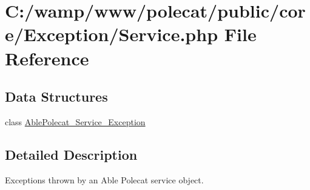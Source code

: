 \hypertarget{_exception_2_service_8php}{}\section{C\+:/wamp/www/polecat/public/core/\+Exception/\+Service.php File Reference}
\label{_exception_2_service_8php}
\subsection*{Data Structures}
\begin{DoxyCompactItemize}
\item 
class \hyperlink{class_able_polecat___service___exception}{Able\+Polecat\+\_\+\+Service\+\_\+\+Exception}
\end{DoxyCompactItemize}


\subsection{Detailed Description}
Exceptions thrown by an Able Polecat service object. 